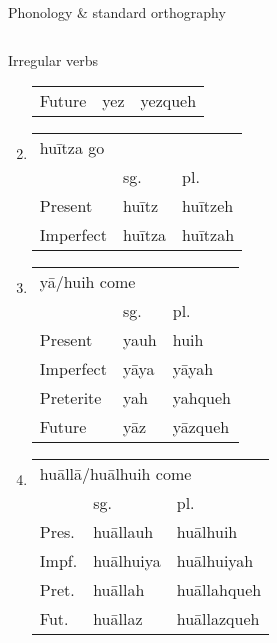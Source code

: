 \documentclass[12pt]{beamer}
\newcommand{\nah}[1]{\textcolor{nahgrn}{#1}}
\newcommand{\trs}[1]{\textcolor{nahblu}{#1}}
\begin{document}
\begin{frame}
\begin{columns}[t]
\begin{column}{.22\linewidth}
\begin{block}{Phonology \& standard orthography}
\begin{threeparttable}
\begin{tablenotes}
\begin{frame}
\begin{frame}
\begin{columns}[t]
\begin{column}{.18\linewidth}
\begin{block}{Irregular verbs}
\begin{enumerate}
\begin{tabular}[t]{lll}
                Future & \nah{yez} & \nah{yezqueh} \\
              \end{tabular}%
            \item \begin{tabular}[t]{lll}
                    \multicolumn{3}{l}{\nah{huītza} \trs{go}} \\
                    & sg.   & pl.\\
                    Present & \nah{huītz} & \nah{huītzeh} \\
                    Imperfect & \nah{huītza} & \nah{huītzah} \\
                  \end{tabular}%
                \item \begin{tabular}[t]{lll}
                        \multicolumn{3}{l}{\nah{yā/huih} \trs{come}} \\
                        & sg.   & pl.\\
                        Present & \nah{yauh} & \nah{huih} \\
                        Imperfect & \nah{yāya} & \nah{yāyah} \\
                        Preterite & \nah{yah} & \nah{yahqueh} \\
                        Future & \nah{yāz} & \nah{yāzqueh} \\
                      \end{tabular}%
                    \item \begin{tabular}[t]{lll}
                            \multicolumn{3}{l}{\nah{huāllā/huālhuih} \trs{come}} \\
                            & sg.   & pl.\\
                            Pres. & \nah{huāllauh} & \nah{huālhuih} \\
                            Impf. & \nah{huālhuiya} & \nah{huālhuiyah} \\
                            Pret. & \nah{huāllah} & \nah{huāllahqueh} \\
                            Fut. & \nah{huāllaz} & \nah{huāllazqueh} \\
                          \end{tabular}%
                        \end{enumerate}
                      \end{block}
                    \end{column}

\end{columns}
\end{frame}
\end{frame}
\end{tablenotes}
\end{threeparttable}
\end{block}
\end{column}
\end{columns}
\end{frame}
\end{document}
